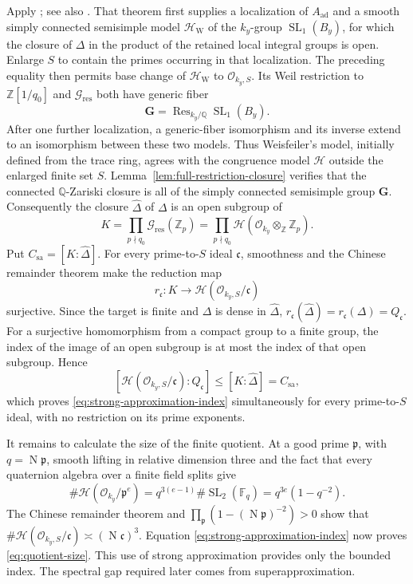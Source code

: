 \documentclass[11pt,reqno]{amsart}
\theoremstyle{definition}
\theoremstyle{remark}
\newcommand{\Q}{\mathbb Q}
\newcommand{\Z}{\mathbb Z}
\newcommand{\cO}{\mathcal O}
\newcommand{\SL}{\operatorname{SL}}
\newcommand{\Res}{\operatorname{Res}}
\newcommand{\Norm}{\operatorname{N}}
\begin{document}
Apply \cite[Theorem~9.1.1]{WeisfeilerStrong}; see also
\cite{MVW,Nori}.  That theorem first supplies a localization of
\(A_{\mathrm{ad}}\) and a smooth simply connected semisimple model
\(\mathcal H_{\mathrm W}\) of the \(k_y\)-group \(\SL_1(B_y)\), for which
the closure of \(\Delta\) in the product of the retained local integral
groups is open.  Enlarge \(S\) to contain the primes occurring in that
localization.  The preceding equality then permits base change of
\(\mathcal H_{\mathrm W}\) to \(\cO_{k_y,S}\).  Its Weil restriction to
\(\Z[1/q_0]\) and \(\mathcal G_{\mathrm{res}}\) both have generic fiber
\[
 \mathbf G=\Res_{k_y/\Q}\SL_1(B_y).
\]
After one further localization, a generic-fiber isomorphism and its inverse
extend to an isomorphism between these two models.  Thus Weisfeiler's model,
initially defined from the trace ring, agrees with the congruence model
\(\mathcal H\) outside the enlarged finite set \(S\).
Lemma~\ref{lem:full-restriction-closure} verifies that the
connected \(\Q\)-Zariski closure is all of the simply connected semisimple
group \(\mathbf G\).  Consequently the closure
\(\widehat\Delta\) of \(\Delta\) is an open subgroup of
\[
 K=\prod_{p\nmid q_0}\mathcal G_{\mathrm{res}}(\Z_p)
  =\prod_{p\nmid q_0}
    \mathcal H(\cO_{k_y}\otimes_\Z\Z_p).
\]
Put \(C_{\mathrm{sa}}=[K:\widehat\Delta]\).  For every prime-to-\(S\)
ideal \(\mathfrak c\), smoothness and the Chinese remainder theorem make
the reduction map
\[
 r_{\mathfrak c}:K\longrightarrow
 \mathcal H(\cO_{k_y,S}/\mathfrak c)
\]
surjective.  Since the target is finite and \(\Delta\) is dense in
\(\widehat\Delta\),
\(r_{\mathfrak c}(\widehat\Delta)=r_{\mathfrak c}(\Delta)=Q_{\mathfrak c}\).
For a surjective homomorphism from a compact group to a finite group, the
index of the image of an open subgroup is at most the index of that open
subgroup.  Hence
\[
 [\mathcal H(\cO_{k_y,S}/\mathfrak c):Q_{\mathfrak c}]
 \le [K:\widehat\Delta]=C_{\mathrm{sa}},
\]
which proves \eqref{eq:strong-approximation-index} simultaneously for every
prime-to-\(S\) ideal, with no restriction on its prime exponents.

It remains to calculate the size of the finite quotient.  At a good prime
\(\mathfrak p\), with \(q=\Norm\mathfrak p\), smooth lifting in relative
dimension three and the fact that every quaternion algebra over a finite
field splits give
\[
 \#\mathcal H(\cO_{k_y}/\mathfrak p^e)
 =q^{3(e-1)}\#\SL_2(\mathbb F_q)
 =q^{3e}(1-q^{-2}).
\]
The Chinese remainder theorem and
\(\prod_{\mathfrak p}(1-(\Norm\mathfrak p)^{-2})>0\) show that
\(\#\mathcal H(\cO_{k_y,S}/\mathfrak c)
\asymp(\Norm\mathfrak c)^3\).  Equation
\eqref{eq:strong-approximation-index} now proves
\eqref{eq:quotient-size}.  This use of strong approximation provides only
the bounded index.  The spectral gap required later comes from
superapproximation.
\end{document}
